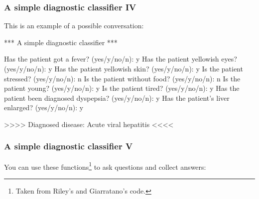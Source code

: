 \documentclass[xcolor={usenames,dvipsnames,svgnames}, compress]{beamer}
\begin{document}
\begin{frame}[fragile]
  \frametitle{A simple diagnostic classifier IV}
  This is an example of a possible conversation:
  \begin{clips-code}
    *** A simple diagnostic classifier ***

    Has the patient got a fever? (yes/y/no/n): y
    Has the patient yellowish eyes? (yes/y/no/n): y
    Has the patient yellowish skin? (yes/y/no/n): y
    Is the patient stressed? (yes/y/no/n): n
    Is the patient without food? (yes/y/no/n): n
    Is the patient young? (yes/y/no/n): y
    Is the patient tired? (yes/y/no/n): y
    Has the patient been diagnosed dyspepsia? (yes/y/no/n): y
    Has the patient's liver enlarged? (yes/y/no/n): y

    >>>> Diagnosed disease: Acute viral hepatitis <<<<
  \end{clips-code}
\end{frame}


\begin{frame}[fragile]
  \frametitle{A simple diagnostic classifier V}
  You can use these functions\footnote{Taken from Riley's and Giarratano's code.} to ask questions and collect
  answers:
\end{frame}
\end{document}
